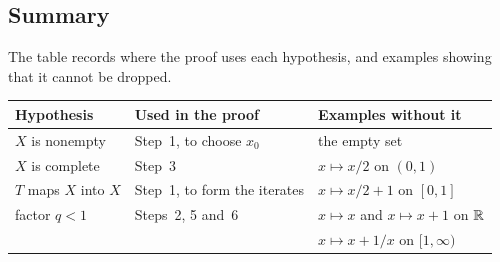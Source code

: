 \subsection*{Summary}
The table records where the proof uses each hypothesis, and examples showing that it cannot be dropped.
\begin{center}
\begin{tabular}{@{}lll@{}}\toprule
Hypothesis & Used in the proof & Examples without it\\\midrule
$X$ is nonempty & Step~1, to choose $x_0$ & the empty set\\
$X$ is complete & Step~3 & $x\mapsto x/2$ on $(0,1)$\\
$T$ maps $X$ into $X$ & Step~1, to form the iterates & $x\mapsto x/2+1$ on $[0,1]$\\
factor $q<1$ & Steps~2, 5 and~6 & $x\mapsto x$ and $x\mapsto x+1$ on $\mathbb R$\\
 & & $x\mapsto x+1/x$ on $[1,\infty)$\\
\bottomrule
\end{tabular}
\end{center}
